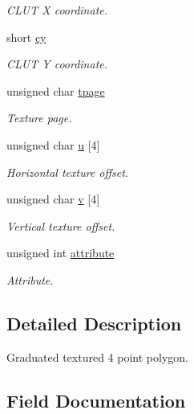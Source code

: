 \begin{DoxyCompactItemize}
\begin{DoxyCompactList}\small\item\em C\+L\+UT X coordinate. \end{DoxyCompactList}\item 
short \hyperlink{structGsGTPoly4_ab5b4698aa650f9ed928bda6a34568e4e}{cy}
\begin{DoxyCompactList}\small\item\em C\+L\+UT Y coordinate. \end{DoxyCompactList}\item 
unsigned char \hyperlink{structGsGTPoly4_a0fde3cb26a7c8c26a7c75861bfe36193}{tpage}
\begin{DoxyCompactList}\small\item\em Texture page. \end{DoxyCompactList}\item 
unsigned char \hyperlink{structGsGTPoly4_a7b5a20a8abed2cedd22cc8e0d6a2c3ea}{u} \mbox{[}4\mbox{]}
\begin{DoxyCompactList}\small\item\em Horizontal texture offset. \end{DoxyCompactList}\item 
unsigned char \hyperlink{structGsGTPoly4_a3cc6edf56ae16106f1abffbf56abced9}{v} \mbox{[}4\mbox{]}
\begin{DoxyCompactList}\small\item\em Vertical texture offset. \end{DoxyCompactList}\item 
unsigned int \hyperlink{structGsGTPoly4_afa584c5cbcc2623f56fb341ee4c4a5ba}{attribute}
\begin{DoxyCompactList}\small\item\em Attribute. \end{DoxyCompactList}\end{DoxyCompactItemize}


\subsection{Detailed Description}
Graduated textured 4 point polygon. 

\subsection{Field Documentation}
\mbox{\label{structGsGTPoly4_afa584c5cbcc2623f56fb341ee4c4a5ba}} 
